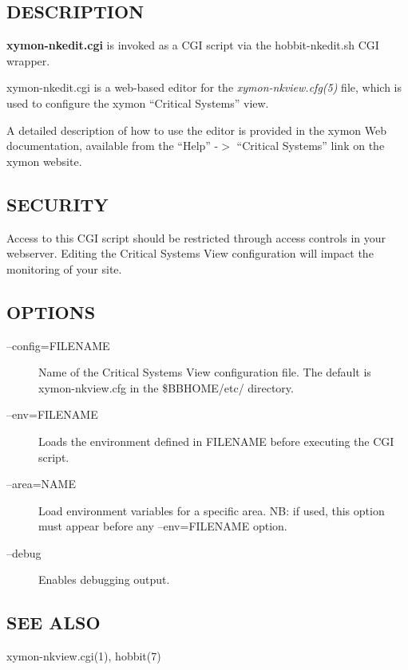 \subsection{DESCRIPTION}
\textbf{xymon-nkedit.cgi} is invoked as a CGI script via the hobbit-nkedit.sh CGI wrapper. 

  xymon-nkedit.cgi is a web-based editor for the
  \emph{xymon-nkview.cfg(5)} file, which is used to configure the
  xymon ``Critical Systems'' view. 


  A detailed description of how to use the editor is provided in the
  xymon Web documentation, available from the ``Help'' -$>$
  ``Critical Systems'' link on the xymon website. 



\subsection{SECURITY}
 Access to this CGI script should be restricted through access
 controls in your webserver. Editing the Critical Systems View
 configuration will impact the monitoring of your site. 


\subsection{OPTIONS}
\begin{description}
\item[--config=FILENAME] Name of the Critical Systems View
  configuration file. The default is xymon-nkview.cfg in the
  \$BBHOME/etc/ directory. 


 

\item[--env=FILENAME] Loads the environment defined in FILENAME before executing the CGI script. 

 

\item[--area=NAME] Load environment variables for a specific area. NB:
  if used, this option must appear before any --env=FILENAME option. 


 

\item[--debug] Enables debugging output. 

 


\end{description}
\subsection{SEE ALSO}
xymon-nkview.cgi(1), hobbit(7) 


